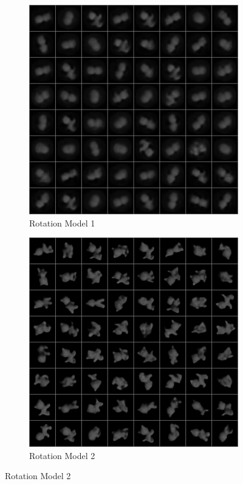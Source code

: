 \documentclass[10pt,a4paper]{article}
\begin{document}
\begin{figure}[!ht]
\begin{subfigure}{0.3\textwidth}
        \includegraphics[width=\textwidth] {cat_4_output0.png}
        \caption{Rotation Model 1}
        \label{cat_rrec}
    \end{subfigure}
    \begin{subfigure}{0.3\textwidth}
        \centering
        \includegraphics[width=\textwidth] {cat_64_output0.png}
        \caption{Rotation Model 2}
        \label{cat_rrec2}
    \end{subfigure}


\end{figure}
\end{document}
